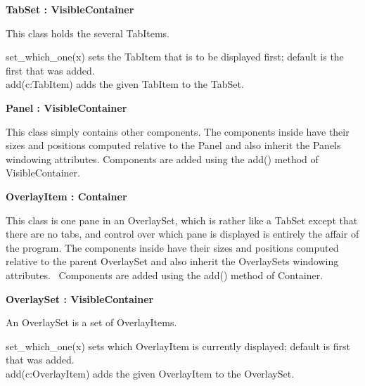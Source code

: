 {\sffamily\bfseries
{}TabSet : VisibleContainer}

This class holds the several TabItems.

set\_which\_one(x) sets the TabItem that is to be displayed first;
default is the first that was added.\\
add(c:TabItem) adds the given TabItem to the TabSet.

{\sffamily\bfseries
{}Panel : VisibleContainer}

This class simply contains other components. The components inside have
their sizes and positions computed relative to the Panel and also
inherit the Panel{\textquotesingle}s windowing attributes. Components
are added using the add() method of VisibleContainer.

{\sffamily\bfseries
{}OverlayItem : Container}

This class is one {\textquotedbl}pane{\textquotedbl} in an OverlaySet,
which is rather like a TabSet except that there are no tabs, and
control over which pane is displayed is entirely the affair of the
program. The components inside have their sizes and positions computed
relative to the parent OverlaySet and also inherit the
OverlaySet{\textquotesingle}s windowing attributes. \ Components are
added using the add() method of Container.

{\sffamily\bfseries
{}OverlaySet : VisibleContainer}

An OverlaySet is a set of OverlayItems.

set\_which\_one(x) sets which OverlayItem is currently displayed;
default is first that was added.\\
add(c:OverlayItem) adds the given OverlayItem to the OverlaySet.


\bigskip

